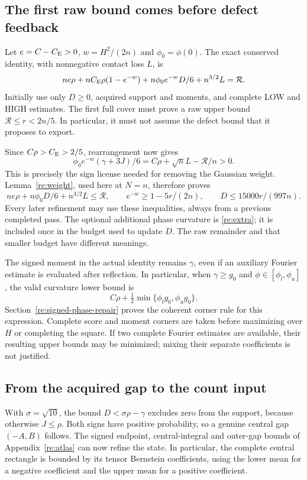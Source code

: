 \subsection{The first raw bound comes before defect feedback}
Let $e=C-C_{\mathrm E}>0$, $w=H^2/(2n)$ and $\phi_0=\phi(0)$.
The exact conserved identity, with nonnegative contact loss $L$, is
\[
 ne\rho+nC_{\mathrm E}\rho(1-e^{-w})+
       n\phi_0e^{-w}D/6+n^{3/2}L=\mathcal R.
\]
Initially use only $D\ge0$, acquired support and moments, and complete
LOW and HIGH estimates. The first full cover must prove a raw upper
bound $\mathcal R\le r<2n/5$. In particular, it must not assume the
defect bound that it proposes to export.

Since $C\rho>C_{\mathrm E}>2/5$, rearrangement now gives
\[
 \phi_0e^{-w}(\gamma+3J)/6
       =C\rho+\sqrt nL-\mathcal R/n>0.
\]
This is precisely the sign license needed for removing the Gaussian
weight. Lemma~\ref{re:weight}, used here at $N=n$, therefore proves
\[
 ne\rho+n\phi_0D/6+n^{3/2}L\le\mathcal R,
 \qquad e^{-w}\ge1-5r/(2n),\qquad D\le15000r/(997n).
\]
Every later refinement may use these inequalities, always from a
previous completed pass. The optional additional phase curvature is
\eqref{re:extra}; it is included once in the budget used to update $D$.
The raw remainder and that smaller budget have different meanings.

The signed moment in the actual identity remains $\gamma$, even if an
auxiliary Fourier estimate is evaluated after reflection. In particular,
when $\gamma\ge g_0$ and $\phi\in[\phi_l,\phi_u]$, the valid
curvature lower bound is
\[
 C\rho+\tfrac12\min\{\phi_lg_0,\phi_ug_0\}.
\]
Section~\ref{re:signed-phase-repair} proves the coherent corner rule
for this expression. Complete score and moment corners are taken before
maximizing over $H$ or completing the square. If two complete Fourier
estimates are available, their resulting upper bounds may be minimized;
mixing their separate coefficients is not justified.

\subsection{From the acquired gap to the count input}
With $\sigma=\sqrt{10}$, the bound
$D<\sigma\rho-\gamma$ excludes zero from the support, because otherwise
$J\le\rho$. Both signs have positive probability, so a genuine central
gap $(-A,B)$ follows. The signed endpoint, central-integral and outer-gap
bounds of Appendix~\ref{re:atlas} can now refine the state. In particular,
the complete central rectangle is bounded by its tensor Bernstein
coefficients, using the lower mean for a negative coefficient and the
upper mean for a positive coefficient.


